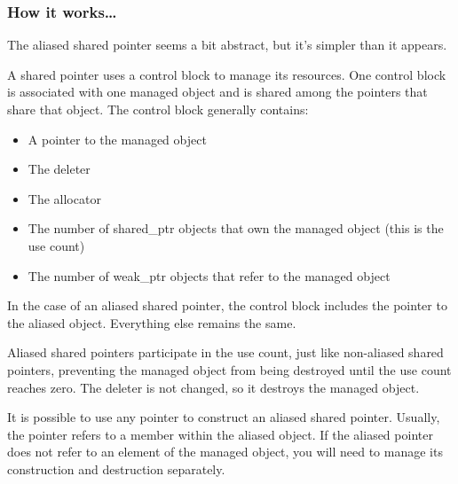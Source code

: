 \subsubsection{How it works…}

The aliased shared pointer seems a bit abstract, but it's simpler than it appears.

A shared pointer uses a control block to manage its resources. One control block is associated with one managed object and is shared among the pointers that share that object. The control block generally contains:

\begin{itemize}
\item 
A pointer to the managed object

\item 
The deleter

\item 
The allocator

\item 
The number of shared\_ptr objects that own the managed object (this is the use count)

\item 
The number of weak\_ptr objects that refer to the managed object
\end{itemize}

In the case of an aliased shared pointer, the control block includes the pointer to the aliased object. Everything else remains the same.

Aliased shared pointers participate in the use count, just like non-aliased shared pointers, preventing the managed object from being destroyed until the use count reaches zero. The deleter is not changed, so it destroys the managed object.

\begin{tcolorbox}[colback=webgreen!5!white,colframe=webgreen!75!black,title=Important Note]
It is possible to use any pointer to construct an aliased shared pointer. Usually, the pointer refers to a member within the aliased object. If the aliased pointer does not refer to an element of the managed object, you will need to manage its construction and destruction separately.
\end{tcolorbox}




























